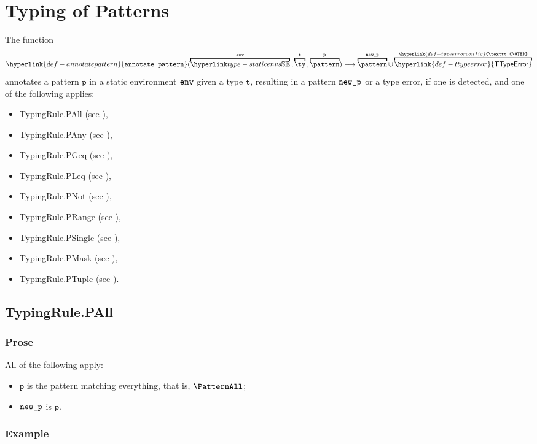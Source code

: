 \documentclass{book}
\newcommand\TTypeError[0]{\hyperlink{def-ttypeerror}{\textsf{TTypeError}}}
\newcommand\TypeErrorConfig[0]{\hyperlink{def-typeerrorconfig}{\texttt{\#TE}}}
\newcommand\annotatepattern[0]{\hyperlink{def-annotatepattern}{\texttt{annotate\_pattern}}}
\newcommand\vp[0]{\texttt{p}}
\newcommand\vt[0]{\texttt{t}}
\begin{document}
\chapter{Typing of Patterns}
\hypertarget{def-annotatepattern}{}
The function
\[
  \annotatepattern(
    \overname{\staticenvs}{\tenv} \aslsep
    \overname{\ty}{\vt} \aslsep
    \overname{\pattern}{\vp}) \aslto \overname{\pattern}{\newp} \cup \overname{\TTypeError}{\TypeErrorConfig}
\]
annotates a pattern $\vp$ in a static environment $\texttt{env}$ given a type $\vt$,
resulting in a pattern $\texttt{new\_p}$ or a type error, if one is detected, and one of the following applies:
\begin{itemize}
\item TypingRule.PAll (see ),
\item TypingRule.PAny (see ),
\item TypingRule.PGeq (see ),
\item TypingRule.PLeq (see ),
\item TypingRule.PNot (see ),
\item TypingRule.PRange (see ),
\item TypingRule.PSingle (see ),
\item TypingRule.PMask (see ),
\item TypingRule.PTuple (see ).
\end{itemize}

\section{TypingRule.PAll \label{sec:TypingRule.PAll}}

\subsection{Prose}
All of the following apply:
\begin{itemize}
  \item $\vp$ is the pattern matching everything, that is, $\PatternAll$;
  \item $\texttt{new\_p}$ is $\vp$.
\end{itemize}

\subsection{Example}
\end{document}
